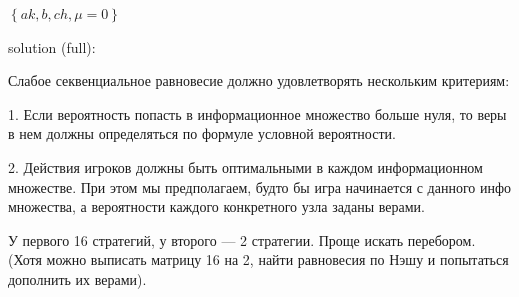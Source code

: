 \begin{problem}[Лес ]
\begin{sol}

  $\left\{ak,b,ch,\mu =0\right\}$\par

solution (full): \par
Слабое секвенциальное равновесие должно удовлетворять нескольким критериям: \par
1. Если вероятность попасть в информационное множество больше нуля, то веры в нем должны определяться по формуле условной вероятности. \par
2. Действия игроков должны быть оптимальными в каждом информационном множестве. При этом мы предполагаем, будто бы игра начинается с данного инфо множества, а вероятности каждого конкретного узла заданы верами.\par

У первого 16 стратегий, у второго --- 2 стратегии. Проще искать перебором. (Хотя можно выписать матрицу 16 на 2, найти равновесия по Нэшу и попытаться дополнить их верами).\par


\end{sol}
\end{problem}
